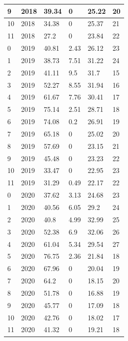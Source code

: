 \documentclass{article}
\begin{document}
\begin{longtable}{|l|l|l|l|l|l|}
9     & 2018 & 39.34 & 0      & 25.22  & 20      \\ \hline
10    & 2018 & 34.38 & 0      & 25.37  & 21      \\ \hline
11    & 2018 & 27.2  & 0      & 23.84  & 22      \\ \hline
0     & 2019 & 40.81 & 2.43   & 26.12  & 23      \\ \hline
1     & 2019 & 38.73 & 7.51   & 31.22  & 24      \\ \hline
2     & 2019 & 41.11 & 9.5    & 31.7   & 15      \\ \hline
3     & 2019 & 52.27 & 8.55   & 31.94  & 16      \\ \hline
4     & 2019 & 61.67 & 7.76   & 30.41  & 17      \\ \hline
5     & 2019 & 75.14 & 2.51   & 28.71  & 18      \\ \hline
6     & 2019 & 74.08 & 0.2    & 26.91  & 19      \\ \hline
7     & 2019 & 65.18 & 0      & 25.02  & 20      \\ \hline
8     & 2019 & 57.69 & 0      & 23.15  & 21      \\ \hline
9     & 2019 & 45.48 & 0      & 23.23  & 22      \\ \hline
10    & 2019 & 33.47 & 0      & 22.95  & 23      \\ \hline
11    & 2019 & 31.29 & 0.49   & 22.17  & 22      \\ \hline
0     & 2020 & 37.62 & 3.13   & 24.68  & 23      \\ \hline
1     & 2020 & 40.56 & 6.05   & 29.2   & 24      \\ \hline
2     & 2020 & 40.8  & 4.99   & 32.99  & 25      \\ \hline
3     & 2020 & 52.38 & 6.9    & 32.06  & 26      \\ \hline
4     & 2020 & 61.04 & 5.34   & 29.54  & 27      \\ \hline
5     & 2020 & 76.75 & 2.36   & 21.84  & 18      \\ \hline
6     & 2020 & 67.96 & 0      & 20.04  & 19      \\ \hline
7     & 2020 & 64.2  & 0      & 18.15  & 20      \\ \hline
8     & 2020 & 51.78 & 0      & 16.88  & 19      \\ \hline
9     & 2020 & 45.77 & 0      & 17.09  & 18      \\ \hline
10    & 2020 & 42.76 & 0      & 18.02  & 17      \\ \hline
11    & 2020 & 41.32 & 0      & 19.21  & 18      \\ \hline

\end{longtable}
\end{document}
